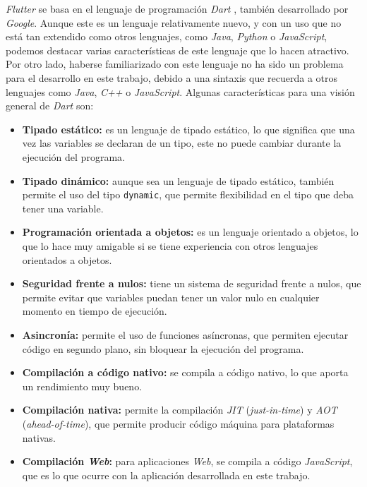 \textit{Flutter} se basa en el lenguaje de programación \textit{Dart} \cite{dart}, 
también desarrollado por \textit{Google}. Aunque este es un lenguaje relativamente nuevo, y con 
un uso que no está tan extendido como otros lenguajes, como \textit{Java}, \textit{Python} o \textit{JavaScript},
podemos destacar varias características de este lenguaje que lo hacen atractivo. Por otro lado, haberse familiarizado
con este lenguaje no ha sido un problema para el desarrollo en este trabajo, debido a una sintaxis que 
recuerda a otros lenguajes como \textit{Java}, \textit{C++} o \textit{JavaScript}. Algunas características 
para una visión general de \textit{Dart} \cite{dart_overview} son:

\begin{itemize}
  \item \textbf{Tipado estático:} es un lenguaje de tipado estático, lo que significa que una vez las 
  variables se declaran de un tipo, este no puede cambiar durante la ejecución del programa.
  \item \textbf{Tipado dinámico:} aunque sea un lenguaje de tipado estático, también permite el uso del tipo
  \texttt{dynamic}, que permite flexibilidad en el tipo que deba tener una variable.
  \item \textbf{Programación orientada a objetos:} es un lenguaje orientado a objetos, lo que lo hace muy amigable
  si se tiene experiencia con otros lenguajes orientados a objetos.
  \item \textbf{Seguridad frente a nulos:} tiene un sistema de seguridad frente a nulos, que permite evitar que variables
puedan tener un valor nulo en cualquier momento en tiempo de ejecución.
  \item \textbf{Asincronía:} permite el uso de funciones asíncronas, que permiten ejecutar código en segundo plano, 
  sin bloquear la ejecución del programa.
  \item \textbf{Compilación a código nativo:} se compila a código nativo, lo que aporta un rendimiento muy bueno.
  \item \textbf{Compilación nativa:} permite la compilación \textit{JIT} (\textit{just-in-time}) y \textit{AOT} (\textit{ahead-of-time}), 
  que permite producir código máquina para plataformas nativas.
  \item \textbf{Compilación \textit{Web}:} para aplicaciones \textit{Web}, se compila a código
  \textit{JavaScript}, que es lo que ocurre con la aplicación desarrollada en este trabajo.
\end{itemize}

